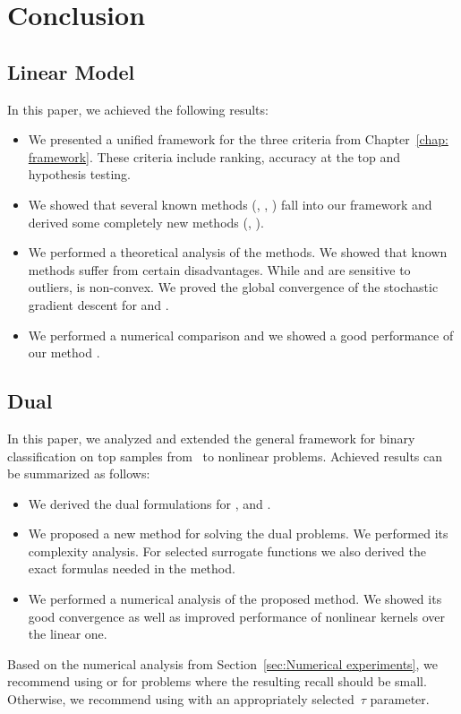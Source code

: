 \chapter{Conclusion}\label{chap: conclusion}

\section{Linear Model}

In this paper, we achieved the following results:
\begin{itemize}
  \item We presented a unified framework for the three criteria from Chapter~\ref{chap: framework}. These criteria include ranking, accuracy at the top and hypothesis testing.
  \item We showed that several known methods (\TopPush, \Grill, \tauFPL) fall into our framework and derived some completely new methods (\PatMat, \PatMatNP).
  \item We performed a theoretical analysis of the methods. We showed that known methods suffer from certain disadvantages. While \TopPush and \tauFPL are sensitive to outliers, \Grill is non-convex. We proved the global convergence of the stochastic gradient descent for \PatMat and \PatMatNP.
  \item We performed a numerical comparison and we showed a good performance of our method \PatMatNP.
\end{itemize}


\section{Dual}\label{sec:Conclusion}

In this paper, we analyzed and extended the general framework for binary classification on top samples from~\cite{adam2021general} to nonlinear problems. Achieved results can be summarized as follows:
\begin{itemize}
    \item We derived the dual formulations for \TopPush, \TopPushK and \PatMat.
    \item We proposed a new method for solving the dual problems. We performed its complexity analysis. For selected surrogate functions we also derived the exact formulas needed in the method.
    \item We performed a numerical analysis of the proposed method. We showed its good convergence as well as improved performance of nonlinear kernels over the linear one.
\end{itemize}
Based on the numerical analysis from Section~\ref{sec:Numerical experiments}, we recommend using \TopPush or \TopPushK for problems where the resulting recall should be small. Otherwise, we recommend using \PatMat with an appropriately selected~$\tau$ parameter.

